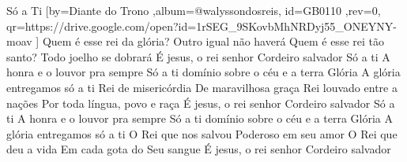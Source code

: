\beginsong
{Só a Ti %
}[by={Diante do Trono %
},album={@walyssondosreis},
id={GB0110 %
},rev={0}, %
qr={https://drive.google.com/open?id=1rSEG_9SKovbMhNRDyj55_ONEYNY-moav %
}]
\beginverse*
Quem é esse rei da glória?
Outro igual não haverá
Quem é esse rei tão santo?
Todo joelho se dobrará
É jesus, o rei senhor
Cordeiro salvador
\endverse
\beginchorus
Só a ti
A honra e o louvor pra sempre
Só a ti domínio sobre o céu e a terra
Glória
A glória entregamos só a ti
\endchorus
\beginverse*
Rei de misericórdia
De maravilhosa graça
Rei louvado entre a nações
Por toda língua, povo e raça
\endverse
\beginverse*
É jesus, o rei senhor
Cordeiro salvador
Só a ti
A honra e o louvor pra sempre
Só a ti domínio sobre o céu e a terra
Glória
A glória entregamos só a ti
\endverse
\beginverse*
O Rei que nos salvou
Poderoso em seu amor
O Rei que deu a vida
Em cada gota do Seu sangue
É jesus, o rei senhor
Cordeiro salvador
\endverse
\vspace{4em} %
\begin{comment}
\lstset{basicstyle=\scriptsize\bf} %
\tab{Solo 1}
\begin{lstlisting}
E|-----------------------------------------------------|
B|-----------------------------------------------------|
G|-----------------------------------------------------|
D|-----------------------------------------------------|
A|-----------------------------------------------------|
E|-----------------------------------------------------|
\end{lstlisting}
\end{comment}
 
